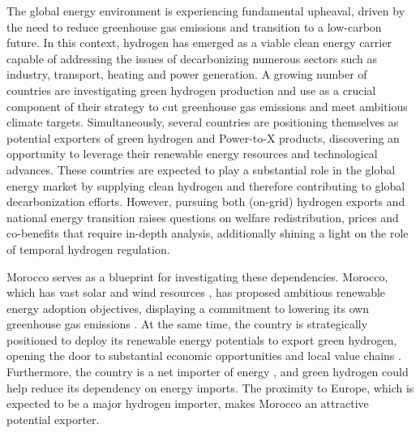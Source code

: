 






The global energy environment is experiencing fundamental upheaval, driven by the need to reduce greenhouse gas emissions and transition to a low-carbon future. In this context, hydrogen has emerged as a viable clean energy carrier capable of addressing the issues of decarbonizing numerous sectors such as industry, transport, heating and power generation. A growing number of countries are investigating green hydrogen production and use as a crucial component of their strategy to cut greenhouse gas emissions and meet ambitious climate targets.
Simultaneously, several countries are positioning themselves as potential exporters of green hydrogen and Power-to-X products, discovering an opportunity to leverage their renewable energy resources and technological advances. %
These countries are expected to play a substantial role in the global energy market by supplying clean hydrogen and therefore contributing to global decarbonization efforts. However, pursuing both (on-grid) hydrogen exports and national energy transition raises questions on welfare redistribution, prices and co-benefits that require in-depth analysis, additionally shining a light on the role of temporal hydrogen regulation.

Morocco serves as a blueprint for investigating these dependencies. Morocco, which has vast solar and wind resources \cite{Peters2023, Touili2018, Sterl2022}, has proposed ambitious renewable energy adoption objectives, displaying a commitment to lowering its own greenhouse gas emissions \cite{CAT2021}. At the same time, the country is strategically positioned to deploy its renewable energy potentials to export green hydrogen, opening the door to substantial economic opportunities and local value chains \cite{Ersoy2022}. Furthermore, the country is a net importer of energy \cite{IEA2022}, and green hydrogen could help reduce its dependency on energy imports. The proximity to Europe, which is expected to be a major hydrogen importer, makes Morocco an attractive potential exporter. %


